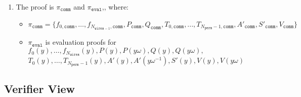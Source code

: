 \begin{enumerate}
    \item The proof is $\pi_{\texttt{comm}}$ and $\pi_{\texttt{eval}}$,, where:
        \begin{itemize}
            \item $\pi_{\texttt{comm}} = \{f_{0, \texttt{comm}}, \dots, f_{N_{\texttt{wires} - 1}, \texttt{comm}},
                    P_{\texttt{comm}}, Q_{\texttt{comm}}, T_{0, \texttt{comm}}, ..., T_{N_{\texttt{perm}} - 1, \texttt{comm}},
                A'_{\texttt{comm}}, S'_{\texttt{comm}}, V_{\texttt{comm}} \}$
            \item  $\pi_{\texttt{eval}}$ is evaluation proofs for $f_0(y), \dots, f_{N_{\texttt{wires}}}(y),
                P(y), P(y\omega), Q(y), Q(y\omega),$ \\
                $T_0(y), \dots, T_{N_{\texttt{perm}} - 1}(y), A'(y), A'(y\omega^{-1}), S'(y), V(y), V(y\omega)$
        \end{itemize}
\end{enumerate}

\subsection{Verifier View}


